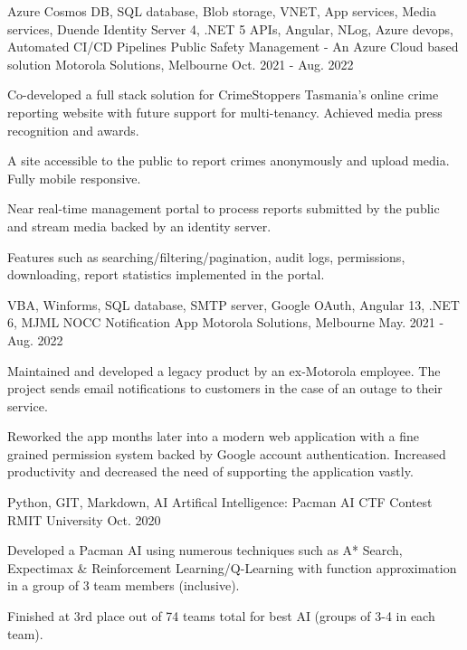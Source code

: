 \begin{cventries}
{    }
  \cventry
    {Azure Cosmos DB, SQL database, Blob storage, VNET, App services, Media services, Duende Identity Server 4, .NET 5 APIs, Angular, NLog, Azure devops, Automated CI/CD Pipelines}
    {Public Safety Management - An Azure Cloud based solution}
    {Motorola Solutions, Melbourne}
    {Oct. 2021 - Aug. 2022}
    {
      \begin{cvitems}
        \item {Co-developed a full stack solution for CrimeStoppers Tasmania's online crime reporting website with future support for multi-tenancy. Achieved media press recognition and awards.}
        \item {A site accessible to the public to report crimes anonymously and upload media. Fully mobile responsive.}
        \item {Near real-time management portal to process reports submitted by the public and stream media backed by an identity server.}
        \item {Features such as searching/filtering/pagination, audit logs, permissions, downloading, report statistics implemented in the portal.}
      \end{cvitems}
    }
  \cventry
    {VBA, Winforms, SQL database, SMTP server, Google OAuth, Angular 13, .NET 6, MJML}
    {NOCC Notification App}
    {Motorola Solutions, Melbourne}
    {May. 2021 - Aug. 2022}
    {
      \begin{cvitems}
        \item {Maintained and developed a legacy product by an ex-Motorola employee. The project sends email notifications to customers in the case of an outage to their service.}
        \item {Reworked the app months later into a modern web application with a fine grained permission system backed by Google account authentication. Increased productivity and decreased the need of supporting the application vastly.}
      \end{cvitems}
    }
  \cventry
    {Python, GIT, Markdown, AI}
    {Artifical Intelligence: Pacman AI CTF Contest}
    {RMIT University}
    {Oct. 2020}
    {
      \begin{cvitems}
        \item {Developed a Pacman AI using numerous techniques such as A* Search, Expectimax \& Reinforcement Learning/Q-Learning with function approximation in a group of 3 team members (inclusive).}
        \item {Finished at 3rd place out of 74 teams total for best AI (groups of 3-4 in each team).}
      \end{cvitems}
    }
\end{cventries}
